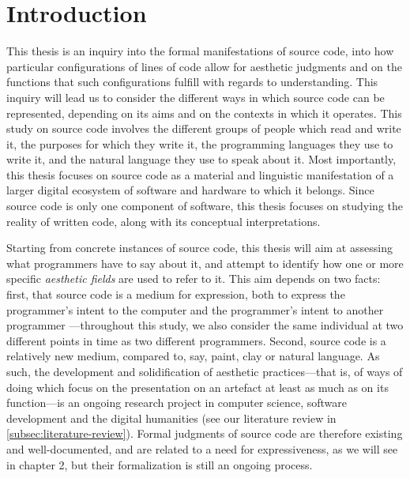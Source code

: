 \chapter{Introduction}
\label{chap:introduction}

This thesis is an inquiry into the formal manifestations of source code, into how particular configurations of lines of code allow for aesthetic judgments and on the functions that such configurations fulfill with regards to understanding. This inquiry will lead us to consider the different ways in which source code can be represented, depending on its aims and on the contexts in which it operates. This study on source code involves the different groups of people which read and write it, the purposes for which they write it, the programming languages they use to write it, and the natural language they use to speak about it. Most importantly, this thesis focuses on source code as a material and linguistic manifestation of a larger digital ecosystem of software and hardware to which it belongs. Since source code is only one component of software, this thesis focuses on studying the reality of written code, along with its conceptual interpretations.

Starting from concrete instances of source code, this thesis will aim at assessing what programmers have to say about it, and attempt to identify how one or more specific \emph{aesthetic fields} are used to refer to it. This aim depends on two facts: first, that source code is a medium for expression, both to express the programmer's intent to the computer \citep{dijkstra_craftsman_1982} and the programmer's intent to another programmer \citep{abelson_structure_1979}—throughout this study, we also consider the same individual at two different points in time as two different programmers. Second, source code is a relatively new medium, compared to, say, paint, clay or natural language. As such, the development and solidification of aesthetic practices—that is, of ways of doing which focus on the presentation on an artefact at least as much as on its function—is an ongoing research project in computer science, software development and the digital humanities (see our literature review in \ref{subsec:literature-review}). Formal judgments of source code are therefore existing and well-documented, and are related to a need for expressiveness, as we will see in chapter 2, but their formalization is still an ongoing process.

